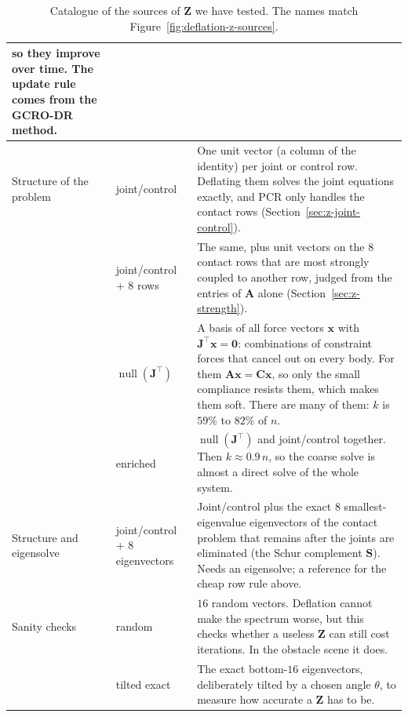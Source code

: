 \begin{table}[h]
\begin{tabular}{|>{\raggedright\arraybackslash}p{2.5cm}|>{\raggedright\arraybackslash}p{3.1cm}|>{\raggedright\arraybackslash}p{8.6cm}|}
        so they improve over time. The update rule comes from the GCRO-DR
        method. \\
    \hline
    Structure of the problem
      & joint/control
      & One unit vector (a column of the identity) per joint or control row.
        Deflating them solves the joint equations exactly, and PCR only
        handles the contact rows (Section~\ref{sec:z-joint-control}). \\
    \cline{2-3}
      & joint/control + 8 rows
      & The same, plus unit vectors on the $8$ contact rows that are most
        strongly coupled to another row, judged from the entries of
        $\mathbf{A}$ alone (Section~\ref{sec:z-strength}). \\
    \cline{2-3}
      & $\operatorname{null}(\mathbf{J}^\top)$
      & A basis of all force vectors $\mathbf{x}$ with
        $\mathbf{J}^\top\mathbf{x} = \mathbf{0}$: combinations of constraint
        forces that cancel out on every body. For them
        $\mathbf{A}\mathbf{x} = \mathbf{C}\mathbf{x}$, so only the small
        compliance resists them, which makes them soft. There are many of
        them: $k$ is $59\%$ to $82\%$ of $n$. \\
    \cline{2-3}
      & enriched
      & $\operatorname{null}(\mathbf{J}^\top)$ and joint/control together.
        Then $k \approx 0.9\,n$, so the coarse solve is almost a direct solve
        of the whole system. \\
    \hline
    Structure and eigensolve
      & joint/control + 8 eigenvectors
      & Joint/control plus the exact $8$ smallest-eigenvalue eigenvectors of
        the contact problem that remains after the joints are eliminated (the
        Schur complement $\mathbf{S}$). Needs an eigensolve; a reference for
        the cheap row rule above. \\
    \hline
    Sanity checks
      & random
      & $16$ random vectors. Deflation cannot make the spectrum worse, but
        this checks whether a useless $\mathbf{Z}$ can still cost iterations.
        In the obstacle scene it does. \\
    \cline{2-3}
      & tilted exact
      & The exact bottom-$16$ eigenvectors, deliberately tilted by a chosen
        angle $\theta$, to measure how accurate a $\mathbf{Z}$ has to be. \\
    \hline
  \end{tabular}
  \caption{Catalogue of the sources of $\mathbf{Z}$ we have tested.
    The names match Figure~\ref{fig:deflation-z-sources}.}
  \label{tab:z-sources-tried}
\end{table}


